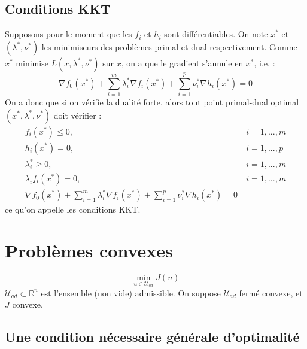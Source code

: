 \subsection{Conditions KKT}
Supposons pour le moment que les $f_i$ et $h_i$ sont différentiables. On note $x^*$ et $(\lambda^*,\nu^*)$ les minimiseurs des problèmes primal et dual respectivement. Comme $x^*$ minimise $L(x,\lambda^*,\nu^*)$ sur $x$, on a que le gradient s'annule en $x^*$, i.e. :
	\[\nabla f_0(x^*)+\sum_{i=1}^m \lambda_i^* \nabla f_i(x^*)+\sum_{i=1}^p \nu_i^*\nabla h_i(x^*)=0\]
On a donc que si on vérifie la dualité forte, alors tout point primal-dual optimal $(x^*,\lambda^*,\nu^*)$ doit vérifier :
\[\begin{aligned}
	f_i(x^*)\leq 0,&\ i=1,...,m\\
	h_i(x^*)=0,&\ i=1,...,p\\
	\lambda_i^*\geq 0,&\ i=1,...,m\\
	\lambda_i f_i(x^*)=0,&\ i=1,...,m\\
\nabla f_0(x^*)+\sum_{i=1}^m \lambda_i^* \nabla f_i(x^*)+\sum_{i=1}^p \nu_i^*\nabla h_i(x^*)=0
\end{aligned}\]
ce qu'on appelle les conditions KKT.

\section{Problèmes convexes}
\[\min_{u\in\mathcal{U}_{ad}} J(u)\]
$\mathcal{U}_{ad}\subset\mathbb{R}^n$ est l'ensemble (non vide) admissible.
On suppose $\mathcal{U}_{ad}$ fermé convexe, et $J$ convexe.


\subsection{Une condition nécessaire générale d'optimalité}



